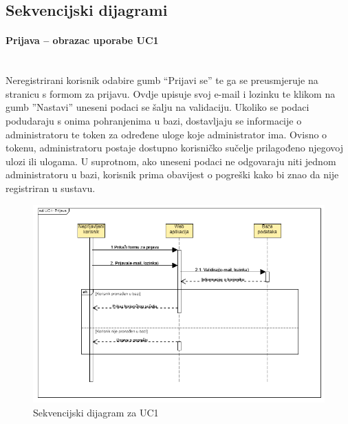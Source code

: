 			\subsection{Sekvencijski dijagrami}
			
				\paragraph{Prijava – obrazac uporabe UC1}\mbox{} \\
				\noindent Neregistrirani korisnik odabire gumb “Prijavi se” te ga se preusmjeruje na stranicu s formom za prijavu. Ovdje upisuje svoj e-mail i lozinku te klikom na gumb ”Nastavi” uneseni podaci se šalju na validaciju. Ukoliko se podaci podudaraju s onima pohranjenima  u bazi, dostavljaju se informacije o administratoru te token za određene uloge koje administrator ima. Ovisno o tokenu, administratoru postaje dostupno korisničko sučelje prilagođeno njegovoj ulozi ili ulogama. U suprotnom, ako uneseni podaci ne odgovaraju niti jednom administratoru u bazi, korisnik prima obavijest o pogreški kako bi znao da nije registriran u sustavu. 
				
				\begin{figure}[H]
					\includegraphics[width=\textwidth]{slike/sd1.PNG} %
					\caption{Sekvencijski dijagram za UC1}
					\label{fig:sd1} %
				\end{figure}
				
